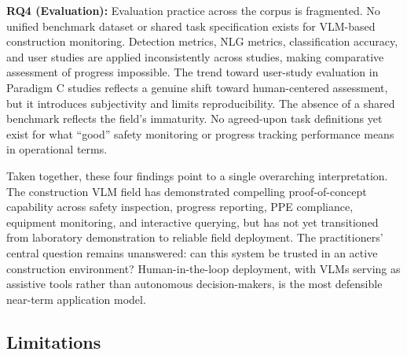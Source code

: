 \documentclass[10pt,letterpaper]{article}
\begin{document}
\textbf{RQ4 (Evaluation):} Evaluation practice across the corpus is fragmented. No unified benchmark dataset or shared task specification exists for VLM-based construction monitoring. Detection metrics, NLG metrics, classification accuracy, and user studies are applied inconsistently across studies, making comparative assessment of progress impossible. The trend toward user-study evaluation in Paradigm C studies reflects a genuine shift toward human-centered assessment, but it introduces subjectivity and limits reproducibility. The absence of a shared benchmark reflects the field's immaturity. No agreed-upon task definitions yet exist for what ``good'' safety monitoring or progress tracking performance means in operational terms.

Taken together, these four findings point to a single overarching interpretation. The construction VLM field has demonstrated compelling proof-of-concept capability across safety inspection, progress reporting, PPE compliance, equipment monitoring, and interactive querying, but has not yet transitioned from laboratory demonstration to reliable field deployment. The practitioners' central question remains unanswered: can this system be trusted in an active construction environment? Human-in-the-loop deployment, with VLMs serving as assistive tools rather than autonomous decision-makers, is the most defensible near-term application model.

\subsection{Limitations}
\end{document}
